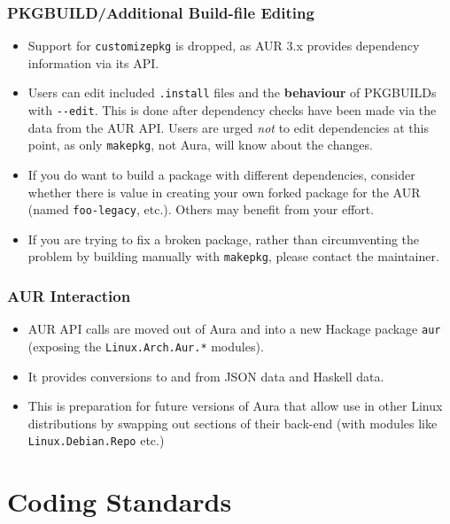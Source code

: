 \documentclass{article}
\begin{document}
\subsubsection{PKGBUILD/Additional Build-file
Editing}\label{pkgbuildadditional-build-file-editing}

\begin{itemize}
\itemsep1pt\parskip0pt
\item
  Support for \texttt{customizepkg} is dropped, as AUR 3.x provides
  dependency information via its API.
\item
  Users can edit included \texttt{.install} files and the
  \textbf{behaviour} of PKGBUILDs with \texttt{-\/-edit}. This is done
  after dependency checks have been made via the data from the AUR API.
  Users are urged \emph{not} to edit dependencies at this point, as only
  \texttt{makepkg}, not Aura, will know about the changes.
\item
  If you do want to build a package with different dependencies,
  consider whether there is value in creating your own forked package
  for the AUR (named \texttt{foo-legacy}, etc.). Others may benefit from
  your effort.
\item
  If you are trying to fix a broken package, rather than circumventing
  the problem by building manually with \texttt{makepkg}, please contact
  the maintainer.
\end{itemize}

\subsubsection{AUR Interaction}\label{aur-interaction}

\begin{itemize}
\itemsep1pt\parskip0pt
\item
  AUR API calls are moved out of Aura and into a new Hackage package
  \texttt{aur} (exposing the \texttt{Linux.Arch.Aur.*} modules).
\item
  It provides conversions to and from JSON data and Haskell data.
\item
  This is preparation for future versions of Aura that allow use in
  other Linux distributions by swapping out sections of their back-end
  (with modules like \texttt{Linux.Debian.Repo} etc.)
\end{itemize}

\section{Coding Standards}\label{coding-standards}
\end{document}

